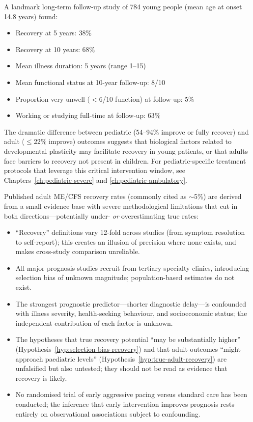 A landmark long-term follow-up study of 784 young people (mean age at onset 14.8 years) found:
\begin{itemize}
    \item Recovery at 5 years: 38\%
    \item Recovery at 10 years: 68\%
    \item Mean illness duration: 5 years (range 1--15)
    \item Mean functional status at 10-year follow-up: 8/10
    \item Proportion very unwell ($<$6/10 function) at follow-up: 5\%
    \item Working or studying full-time at follow-up: 63\%
\end{itemize}

The dramatic difference between pediatric (54--94\% improve or fully recover) and adult ($\leq$22\% improve) outcomes suggests that biological factors related to developmental plasticity may facilitate recovery in young patients, or that adults face barriers to recovery not present in children. For pediatric-specific treatment protocols that leverage this critical intervention window, see Chapters~\ref{ch:pediatric-severe} and \ref{ch:pediatric-ambulatory}.

\begin{limitation}
Published adult ME/CFS recovery rates (commonly cited as $\sim$5\%) are derived from a small evidence base with severe methodological limitations that cut in both directions---potentially under- \emph{or} overestimating true rates:
\begin{itemize}
    \item ``Recovery'' definitions vary 12-fold across studies (from symptom resolution to self-report); this creates an illusion of precision where none exists, and makes cross-study comparison unreliable.
    \item All major prognosis studies recruit from tertiary specialty clinics, introducing selection bias of unknown magnitude; population-based estimates do not exist.
    \item The strongest prognostic predictor---shorter diagnostic delay---is confounded with illness severity, health-seeking behaviour, and socioeconomic status; the independent contribution of each factor is unknown.
    \item The hypotheses that true recovery potential ``may be substantially higher'' (Hypothesis~\ref{hyp:selection-bias-recovery}) and that adult outcomes ``might approach paediatric levels'' (Hypothesis~\ref{hyp:true-adult-recovery}) are unfalsified but also untested; they should not be read as evidence that recovery is likely.
    \item No randomised trial of early aggressive pacing versus standard care has been conducted; the inference that early intervention improves prognosis rests entirely on observational associations subject to confounding.
\end{itemize}
\end{limitation}


